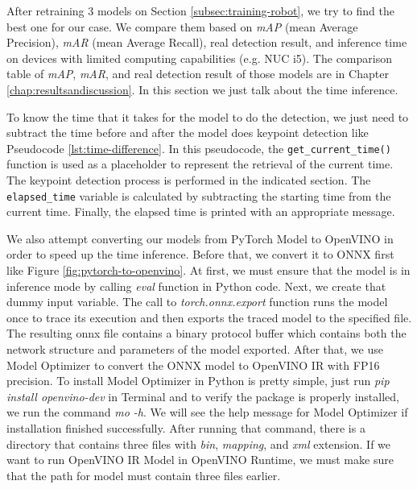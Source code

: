 After retraining 3 models on Section \ref{subsec:training-robot}, we try to find the best one for our case. We compare them based on \emph{mAP} (mean Average Precision), \emph{mAR} (mean Average Recall),
real detection result, and inference time on devices with limited computing capabilities (e.g. NUC i5).
The comparison table of \emph{mAP}, \emph{mAR}, and real detection result of those models are in Chapter \ref{chap:resultsandiscussion}. In this section we just talk about the time inference.

To know the time that it takes for the model to do the detection, we just need to subtract the time before and after the model does keypoint detection like Pseudocode \ref{lst:time-difference}.
In this pseudocode, the \verb|get_current_time()| function is used as a placeholder to represent the retrieval of the current time. The keypoint detection process is performed in the indicated section.
The \verb|elapsed_time| variable is calculated by subtracting the starting time from the current time. Finally, the elapsed time is printed with an appropriate message.

We also attempt converting our models from PyTorch Model to OpenVINO in order to speed up the time inference. Before that, we convert it to ONNX first like Figure \ref{fig:pytorch-to-openvino}.
At first, we must ensure that the model is in inference mode by calling \emph{eval} function in Python code.
Next, we create that dummy input variable. The call to \emph{torch.onnx.export} function runs the model once to trace its execution and then exports the traced model to the specified file.
The resulting onnx file contains a binary protocol buffer which contains both the network structure and parameters of the model exported.
After that, we use Model Optimizer to convert the ONNX model to OpenVINO IR with FP16 precision. To install Model Optimizer in Python is pretty simple, just run
\emph{pip install openvino-dev} in Terminal and to verify the package is properly installed, we run the command \emph{mo -h}. We will see the help message for Model Optimizer if installation finished successfully.
After running that command, there is a directory that contains three files with \emph{bin}, \emph{mapping}, and \emph{xml} extension.
If we want to run OpenVINO IR Model in OpenVINO Runtime, we must make sure that the path for model must contain three files earlier.

